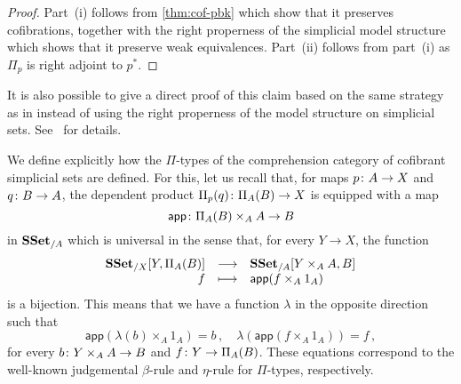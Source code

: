 \documentclass[reqno,10pt,a4paper,oneside,draft]{amsart}
\begin{document}
\begin{proof} Part~(i) follows from \cref{thm:cof-pbk} which show that it preserves cofibrations, together with the right properness of the simplicial model structure which shows that it preserve weak equivalences.
 Part~(ii) follows from part~(i) as $\Pi_p$ is right adjoint to $p^*$.
\end{proof}


It is also possible to give a direct proof of this claim based on the same strategy as in \cite{gambino2017frobenius} instead of using the right properness of the model structure on simplicial sets. See~\cite{GambinoN:anocp} for details.


 
\begin{remark}  \label{rem:pi-types}
We define explicitly how the $\Pi$-types of the comprehension category of cofibrant simplicial sets are defined. For this, let us recall that, for maps $p \colon A \to X$ and $q \colon B \to A$,  the dependent product $\Pi_p(q) \colon \Pi_A(B)
\to X$ is equipped with a map
\[
\mathsf{app} \colon \Pi_A(B) \times_A  A \to B
\] 
in $\mathbf{SSet}_{/A}$ which is universal in the sense that, for every  $Y \to X$, the function
\[
\begin{array}{rcl} 
 \mathbf{SSet}_{/X}[ Y , \Pi_A(B)] & \longrightarrow &  \mathbf{SSet}_{/A}[Y \times_A A, B]  \\
  f & \longmapsto & \mathsf{app}(f \times_A 1_A) 
  \end{array} 
 \]
 is a bijection. This means that we have a function $\lambda$ in the opposite direction such that  
 \begin{equation}
 \label{equ:betaeta}
 \mathsf{app}(\lambda(b) \times_A 1_A) = b   \, , \quad
 \lambda( \mathsf{app}(f \times_A 1_A)) = f \, ,
 \end{equation}
 for every $b \colon Y \times_A A \to B$ and $f \colon Y \to \Pi_A(B)$.  These equations correspond to the
 well-known judgemental $\beta$-rule and $\eta$-rule for $\Pi$-types, respectively.
 

\end{remark}
\end{document}
